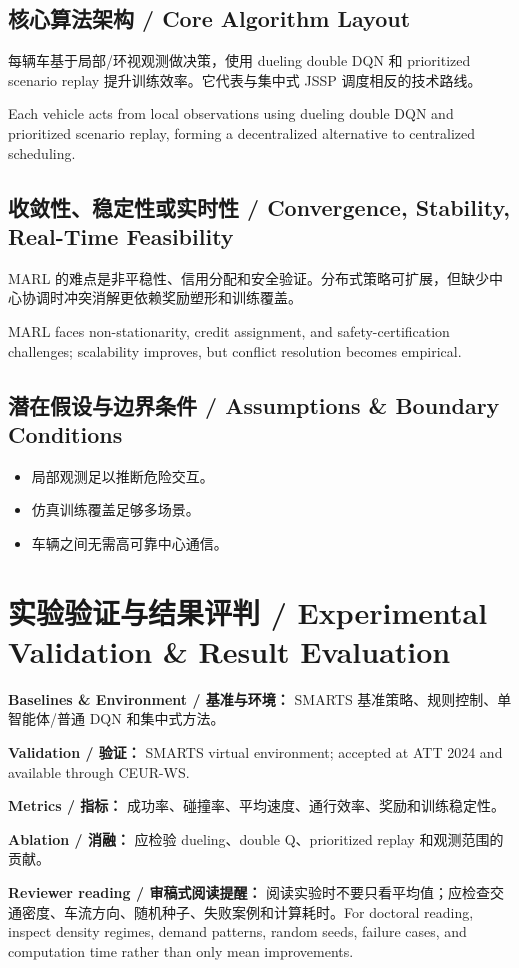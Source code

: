 \documentclass[UTF8,a4paper,11pt,fontset=fandol]{ctexart}
\begin{document}
\subsection{核心算法架构 / Core Algorithm Layout}
每辆车基于局部/环视观测做决策，使用 dueling double DQN 和 prioritized scenario replay 提升训练效率。它代表与集中式 JSSP 调度相反的技术路线。

Each vehicle acts from local observations using dueling double DQN and prioritized scenario replay, forming a decentralized alternative to centralized scheduling.

\subsection{收敛性、稳定性或实时性 / Convergence, Stability, Real-Time Feasibility}
MARL 的难点是非平稳性、信用分配和安全验证。分布式策略可扩展，但缺少中心协调时冲突消解更依赖奖励塑形和训练覆盖。

MARL faces non-stationarity, credit assignment, and safety-certification challenges; scalability improves, but conflict resolution becomes empirical.

\subsection{潜在假设与边界条件 / Assumptions \& Boundary Conditions}
\begin{itemize}
\item 局部观测足以推断危险交互。
\item 仿真训练覆盖足够多场景。
\item 车辆之间无需高可靠中心通信。
\end{itemize}


\section{实验验证与结果评判 / Experimental Validation \& Result Evaluation}
\textbf{Baselines \& Environment / 基准与环境：} SMARTS 基准策略、规则控制、单智能体/普通 DQN 和集中式方法。

\textbf{Validation / 验证：} SMARTS virtual environment; accepted at ATT 2024 and available through CEUR-WS.

\textbf{Metrics / 指标：} 成功率、碰撞率、平均速度、通行效率、奖励和训练稳定性。

\textbf{Ablation / 消融：} 应检验 dueling、double Q、prioritized replay 和观测范围的贡献。

\textbf{Reviewer reading / 审稿式阅读提醒：} 阅读实验时不要只看平均值；应检查交通密度、车流方向、随机种子、失败案例和计算耗时。For doctoral reading, inspect density regimes, demand patterns, random seeds, failure cases, and computation time rather than only mean improvements.
\end{document}
